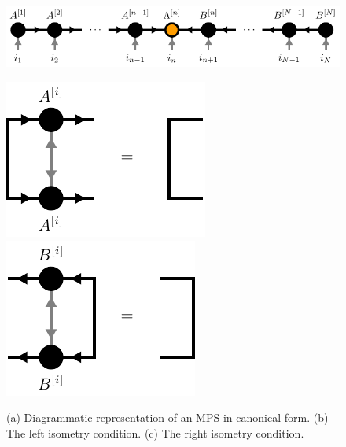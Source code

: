 \begin{figure}
	\centering
	\begin{minipage}{1.0\textwidth}
		\centering
		\subcaptionbox{\label{fig:mps_canonical_form_general_definition}}
		{%
			\includegraphics[scale=1]{figures/tikz/Tensor_Networks/mps_canonical_form/mps_canonical_form_a.pdf}
		}
	\end{minipage}
	\par\medskip
	\centering
	\subcaptionbox{\label{fig:mps_left_isometry_condition}}
	{%
		\includegraphics[scale=1]{figures/tikz/Tensor_Networks/mps_canonical_form/mps_canonical_form_b.pdf}
	}
	\quad\quad\quad\quad\quad
	\subcaptionbox{\label{fig:mps_right_isometry_condition}}
	{%
		\includegraphics[scale=1]{figures/tikz/Tensor_Networks/mps_canonical_form/mps_canonical_form_c.pdf}
	}
	\caption{(a) Diagrammatic representation of an MPS in canonical form. (b) The left isometry condition. (c) The right isometry condition.}
	\label{fig:mps_canonical}
\end{figure}
